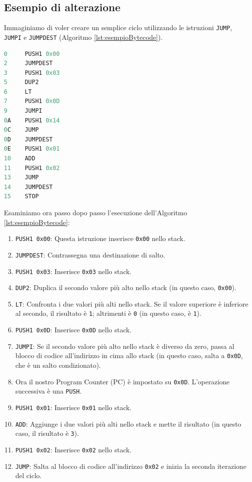 \subsection{Esempio di alterazione}\label{subsec:esempioAlterazione}
Immaginiamo di voler creare un semplice ciclo utilizzando le istruzioni {\tt JUMP}, {\tt JUMPI} e {\tt JUMPDEST} (Algoritmo \ref*{lst:esempioBytecode}).

\begin{algorithm}[ht]
\caption{Esempio ciclo While in EVM bytecode.}
\label{lst:esempioBytecode}
\begin{lstlisting}[style=customsolidity, language=C, numbers=none]
0     PUSH1 0x00
2     JUMPDEST
3     PUSH1 0x03
5     DUP2
6     LT
7     PUSH1 0x0D
9     JUMPI
0A    PUSH1 0x14
0C    JUMP
0D    JUMPDEST
0E    PUSH1 0x01
10    ADD
11    PUSH1 0x02
13    JUMP
14    JUMPDEST
15    STOP
\end{lstlisting}
\end{algorithm}

Esaminiamo ora passo dopo passo l’esecuzione dell'Algoritmo \ref*{lst:esempioBytecode}:
\begin{enumerate}
    \item {\tt PUSH1 0x00}: Questa istruzione inserisce {\tt 0x00} nello stack.
    \item {\tt JUMPDEST}: Contrassegna una destinazione di salto.
    \item {\tt PUSH1 0x03}: Inserisce {\tt 0x03} nello stack.
    \item {\tt DUP2}: Duplica il secondo valore più alto nello stack (in questo caso, {\tt 0x00}).
    \item {\tt LT}: Confronta i due valori più alti nello stack. Se il valore superiore è inferiore al secondo, il risultato è {\tt 1}; altrimenti è {\tt 0} 
        (in questo caso, è {\tt 1}).
    \item {\tt PUSH1 0x0D}: Inserisce {\tt 0x0D} nello stack.
    \item {\tt JUMPI}: Se il secondo valore più alto nello stack è diverso da zero, passa al blocco di codice all’indirizzo in cima allo stack (in questo 
        caso, salta a {\tt 0x0D}, che è un salto condizionato).
    \item Ora il nostro Program Counter (PC) è impostato su {\tt 0x0D}. L’operazione successiva è una {\tt PUSH}.
    \item {\tt PUSH1 0x01}: Inserisce {\tt 0x01} nello stack.
    \item {\tt ADD}: Aggiunge i due valori più alti nello stack e mette il risultato (in questo caso, il risultato è {\tt 3}).
    \item {\tt PUSH1 0x02}: Inserisce {\tt 0x02} nello stack.
    \item {\tt JUMP}: Salta al blocco di codice all’indirizzo {\tt 0x02} e inizia la seconda iterazione del ciclo.
\end{enumerate}

